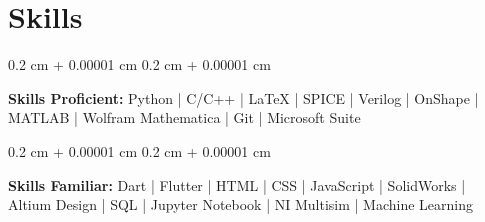 \documentclass[10pt, letterpaper]{article}
\newenvironment{onecolentry}{
    \begin{adjustwidth}{
        0.2 cm + 0.00001 cm
    }{
        0.2 cm + 0.00001 cm
    }
}{
    \end{adjustwidth}
} %
\begin{document}
    
    \section{Skills}



        
        \begin{onecolentry}
            \textbf{Skills Proficient:} Python | C/C++ | LaTeX | SPICE | Verilog | OnShape | MATLAB | Wolfram Mathematica | Git | Microsoft Suite
        \end{onecolentry}

        \vspace{0.2 cm}

        \begin{onecolentry}
            \textbf{Skills Familiar:} Dart | Flutter | HTML | CSS | JavaScript | SolidWorks | Altium Design | SQL | Jupyter Notebook | NI Multisim | Machine Learning
        \end{onecolentry}


    
\end{document}
